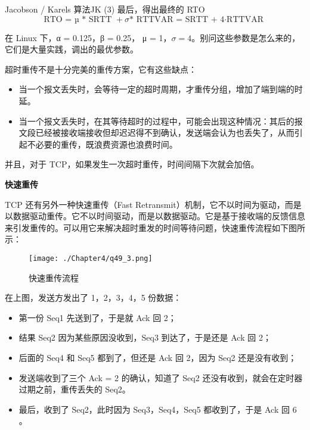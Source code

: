 \documentclass[cn,11pt,color=blue,lang=cn]{elegantbook}
\begin{document}
\begin{solution}
\begin{myDefinition}{Jacobson / Karels 算法}{JK}
(3) 最后，得出最终的 RTO
\begin{equation}
   \label{eq:2}
   \text{RTO = µ * SRTT } + \sigma \text{* RTTVAR  =  SRTT + 4·RTTVAR  }
\end{equation}

在 Linux 下，α = 0.125，β = 0.25， μ = 1，$\sigma = 4$。别问这些参数是怎么来的，它们是大量实践，调出的最优参数。
\end{myDefinition}
超时重传不是十分完美的重传方案，它有这些缺点：

\begin{itemize}
	\item 当一个报文丢失时，会等待一定的超时周期，才重传分组，增加了端到端的时延。
	\item 当一个报文丢失时，在其等待超时的过程中，可能会出现这种情况：其后的报文段已经被接收端接收但却迟迟得不到确认，发送端会认为也丢失了，从而引起不必要的重传，既浪费资源也浪费时间。
\end{itemize}

并且，对于 TCP，如果发生一次超时重传，时间间隔下次就会加倍。

\end{solution}

\begin{note} \textbf{快速重传} \end{note}
TCP 还有另外一种快速重传（Fast Retransmit）机制，它不以时间为驱动，而是以数据驱动重传。它不以时间驱动，而是以数据驱动。它是基于接收端的反馈信息来引发重传的。可以用它来解决超时重发的时间等待问题，快速重传流程如下图所示：

\begin{figure}[!h]
\centering
\texttt{[image: ./Chapter4/q49\_3.png]}
\caption{快速重传流程}
\label{fig49_3}
\end{figure}

在上图，发送方发出了 1，2，3，4，5 份数据：

\begin{itemize}
	\item 第一份 Seq1 先送到了，于是就 Ack 回 2；
	\item 结果 Seq2 因为某些原因没收到，Seq3 到达了，于是还是 Ack 回 2；
	\item 后面的 Seq4 和 Seq5 都到了，但还是 Ack 回 2，因为 Seq2 还是没有收到；
	\item 发送端收到了三个 Ack = 2 的确认，知道了 Seq2 还没有收到，就会在定时器过期之前，重传丢失的 Seq2。
	\item 最后，收到了 Seq2，此时因为 Seq3，Seq4，Seq5 都收到了，于是 Ack 回 6 。
\end{itemize}
\end{document}
